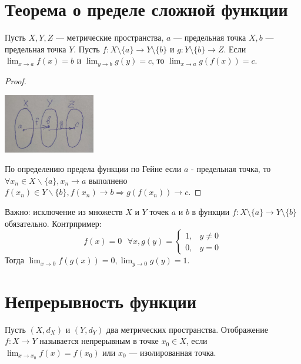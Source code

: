     \section{Теорема о пределе сложной функции}
    
    \begin{theorem}
    	Пусть $X, Y, Z$ — метрические пространства, $a$ — предельная точка $X, b$ — предельная точка $Y$. Пусть $f : X \setminus \{a\} \rightarrow Y \setminus \{b\}$ и $g : Y \setminus \{b\} \rightarrow Z$. Если $\displaystyle \lim_{x \to a} f(x) = b$ и $\displaystyle \lim_{y \to b} g(y) = c$, то $\displaystyle \lim_{x \to a} g(f(x)) = c$.
    \end{theorem}
    
    \begin{proof}
    	$ $
    	\begin{center}
    		\includegraphics[width=0.3\textwidth]{img/lecture35/limit_of_a_complex_function}
    	\end{center}
    	По определению предела функции по Гейне если $a$ - предельная точка, то $\forall x_n \in X \backslash \{a\}, x_n \to a$ выполнено $f(x_n) \in Y \backslash \{b\}, f(x_n) \to b \Rightarrow g(f(x_n)) \to c$.
    \end{proof}
    
    Важно: исключение из множеств $X$ и $Y$ точек $a$ и $b$ в функции $f: X \setminus \{a\} \rightarrow Y \setminus \{b\}$ обязательно. Контрпример:
    \begin{equation*}
    	f(x) = 0 \text{ } \forall x, g(y) = 
    	\begin{cases}
    		1, & y \neq 0 \\
    		0, & y = 0
    	\end{cases}
    \end{equation*}
    Тогда $\lim_{x \to 0} f(g(x)) = 0, \lim_{y \to 0} g(y) = 1$.
    
    \section{Непрерывность функции}
    
    \begin{definition}
    	Пусть $(X, d_X)$ и $(Y, d_Y)$ два метрических пространства. Отображение $f : X \rightarrow Y$ называется непрерывным в точке $x_0 \in X$, если $\displaystyle \lim_{x \to x_0} f(x) = f(x_0)$ или $x_0$ — изолированная точка.
    \end{definition}
    
